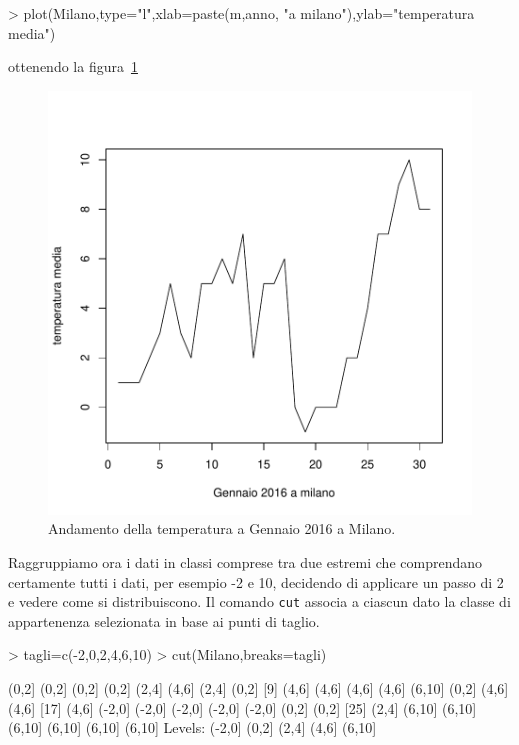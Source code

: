 \documentclass[onecolumn,12pt]{book}
\begin{document}
\begin{Schunk}
\begin{Sinput}
> plot(Milano,type="l",xlab=paste(m,anno, "a milano"),ylab="temperatura media")
\end{Sinput}
\end{Schunk}
ottenendo la figura~\ref{fig:datiist}
\begin{figure}[htbp]
\begin{center}
\includegraphics{RbookParte2-030}
\caption{ Andamento della temperatura a Gennaio 2016  a Milano. }
\label{fig:datiist}
\end{center}
\end{figure}

Raggruppiamo ora i dati in classi comprese  tra due estremi che comprendano certamente tutti i dati, per esempio -2 e 10, decidendo di applicare un passo di 2 e vedere come si distribuiscono. Il comando \texttt{cut} associa a ciascun dato la classe di appartenenza selezionata in base ai punti di taglio.

\begin{Schunk}
\begin{Sinput}
> tagli=c(-2,0,2,4,6,10)
> cut(Milano,breaks=tagli)
\end{Sinput}
\begin{Soutput}
 [1] (0,2]  (0,2]  (0,2]  (0,2]  (2,4]  (4,6]  (2,4]  (0,2] 
 [9] (4,6]  (4,6]  (4,6]  (4,6]  (6,10] (0,2]  (4,6]  (4,6] 
[17] (4,6]  (-2,0] (-2,0] (-2,0] (-2,0] (-2,0] (0,2]  (0,2] 
[25] (2,4]  (6,10] (6,10] (6,10] (6,10] (6,10] (6,10]
Levels: (-2,0] (0,2] (2,4] (4,6] (6,10]
\end{Soutput}
\end{Schunk}
\end{document}
